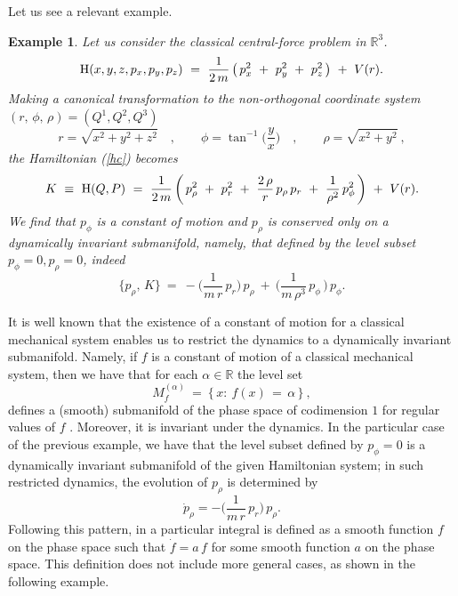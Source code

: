 \documentclass[10pt,a4paper]{article}
\newtheorem{example}{Example}
\begin{document}
Let us see a relevant example.
\begin{example}
\label{excfp}
Let us consider the classical central-force problem in $\mathbb{R}^3$.
\begin{equation}
\label{hc}
    {\rm H}(x,y,z,p_{x},p_{y},p_{z}) \ = \ \frac{1}{2\,m}\,\big(\,p_x^2 \ + \ p_y^2 \ + \ p_z^2 \,\big)  \ + \ V(r).
\end{equation}
Making a canonical transformation to the non-orthogonal coordinate system $(r,\,\phi,\,\rho)=(Q^1,Q^2,Q^3)$
\[
r= \sqrt{x^2+y^2+z^2} \quad , \qquad  \phi= \tan^{-1}\bigg(\frac{y}{x}\bigg) \quad , \qquad \rho= \sqrt{x^2+y^2} \ ,
\]
the Hamiltonian (\ref{hc}) becomes
\begin{equation*}
\label{hc2}
  K \ \equiv \ {\rm H}(Q,P) \ = \ \frac{1}{2\,m}\,\bigg(\,p_{\rho}^2  \ + \ p_{r}^2  \ + \ \frac{2\,\rho}{r}\, p_{\rho}\, p_{r} \ + \ \frac{1}{\rho^2}\, p_{\phi}^2\,\bigg) \ + \ V(r).
\end{equation*}
We find that $p_{\phi}$ is a constant of motion and  $p_\rho$ is conserved only on a dynamically invariant submanifold, namely, that defined by the level subset $p_{\phi}=0,p_{\rho}=0$, indeed
\[
\lbrace p_{\rho},\,K\rbrace \ = \ - \bigg(\frac{1}{m\,r}\,p_r\bigg)\,p_\rho \ + \ \bigg(\frac{1}{m\,\rho^3}\,p_{\phi}\,\bigg)\,p_{\phi}.
\]
\end{example}

It is well known that the existence of a constant of motion for a classical mechanical system enables us to restrict the dynamics to a dynamically invariant submanifold. Namely, if $f$ is a constant of motion of a classical mechanical system, then we have that for each $\alpha\in\mathbb{R}$ the level set 
\[ 
M^{(\alpha)}_{f} \ = \ \lbrace\, x: \ f(x)\,=\,\alpha \, \rbrace \ ,
\]
defines a (smooth) submanifold of the phase space of codimension $1$ for regular values of $f$ \cite{Lee2012}. Moreover, it is invariant under the dynamics. In the particular case of the previous example, we have that the level subset defined by $p_{\phi}=0$ is a dynamically invariant submanifold of the given Hamiltonian system; in such restricted dynamics, the evolution of $p_{\rho}$ is determined by
\begin{equation*}
\dot{p}_{\rho}=- \bigg(\frac{1}{m\,r}\,p_r\bigg)\,p_\rho .
\end{equation*}
Following this pattern, in \cite{escobar2024particular,azuaje2025particular} a particular integral is defined as a smooth function $f$ on the phase space such that $\dot{f}=a\,f$ for some smooth function $a$ on the phase space. This definition does not include more general cases, as shown in the following example.
\end{document}
